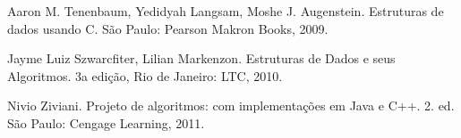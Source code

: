{{        Aaron M. Tenenbaum, Yedidyah Langsam, Moshe J. Augenstein. Estruturas de dados usando C. São Paulo: Pearson Makron Books, 2009.

        Jayme Luiz Szwarcfiter, Lilian Markenzon. Estruturas de Dados e seus Algoritmos. 3a edição, Rio de Janeiro: LTC, 2010.

        Nivio Ziviani. Projeto de algoritmos: com implementações em Java e C++. 2. ed. São Paulo: Cengage Learning, 2011.
    }
}